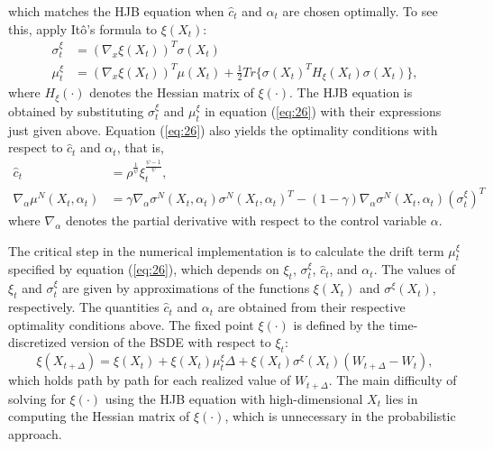 \documentclass{article}
\begin{document}
which matches the HJB equation when $\hat{c}_{t}$ and $\alpha_{t}$ are chosen optimally. To see this, apply Itô's formula to $\xi(X_{t})$:
\begin{align*}
\sigma_{t}^{\xi}&=(\nabla_{x}\xi(X_{t}))^{T}\sigma(X_{t}) \\
\mu_{t}^{\xi}&=(\nabla_{x}\xi(X_{t}))^{T}\mu(X_{t})+\frac{1}{2}Tr\{\sigma(X_{t})^{T}H_{\xi}(X_{t})\sigma(X_{t})\},
\end{align*}
where $H_{\xi}(\cdot)$ denotes the Hessian matrix of $\xi(\cdot)$. The HJB equation is obtained by substituting $\sigma_{t}^{\xi}$ and $\mu_{t}^{\xi}$ in equation (\ref{eq:26}) with their expressions just given above. Equation (\ref{eq:26}) also yields the optimality conditions with respect to $\hat{c}_{t}$ and $\alpha_{t}$, that is,
\begin{align*}
\hat{c}_{t}&=\rho^{\frac{1}{\psi}}\xi_{t}^{\frac{\psi-1}{\psi}}, \\
\nabla_{\alpha}\mu^{N}(X_{t},\alpha_{t})&=\gamma\nabla_{\alpha}\sigma^{N}(X_{t},\alpha_{t})\sigma^{N}(X_{t},\alpha_{t})^{T}-(1-\gamma)\nabla_{\alpha}\sigma^{N}(X_{t},\alpha_{t})(\sigma_{t}^{\xi})^{T}
\end{align*}
where $\nabla_{\alpha}$ denotes the partial derivative with respect to the control variable $\alpha$.

The critical step in the numerical implementation is to calculate the drift term $\mu_{t}^{\xi}$ specified by equation (\ref{eq:26}), which depends on $\xi_{t}$, $\sigma_{t}^{\xi}$, $\hat{c}_{t}$, and $\alpha_{t}$. The values of $\xi_{t}$ and $\sigma_{t}^{\xi}$ are given by approximations of the functions $\xi(X_{t})$ and $\sigma^{\xi}(X_{t})$, respectively. The quantities $\hat{c}_{t}$ and $\alpha_{t}$ are obtained from their respective optimality conditions above. The fixed point $\xi(\cdot)$ is defined by the time-discretized version of the BSDE with respect to $\xi_{t}$:
\[
\xi(X_{t+\Delta})=\xi(X_{t})+\xi(X_{t})\mu_{t}^{\xi}\Delta+\xi(X_{t})\sigma^{\xi}(X_{t})(W_{t+\Delta}-W_{t}),
\]
which holds path by path for each realized value of $W_{t+\Delta}$. The main difficulty of solving for $\xi(\cdot)$ using the HJB equation with high-dimensional $X_{t}$ lies in computing the Hessian matrix of $\xi(\cdot)$, which is unnecessary in the probabilistic approach.
\end{document}
